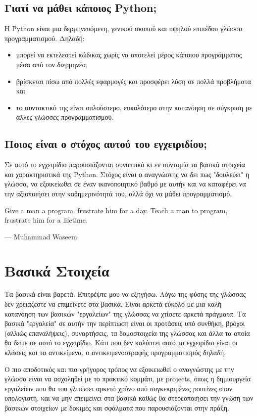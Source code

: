\documentclass[14pt]{extreport}
\begin{document}
\section{Γιατί να μάθει κάποιος Python;}

Η Python είναι μια δερμηνευόμενη, γενικού σκοπού και υψηλού επιπέδου γλώσσα
προγραμματισμού. Δηλαδή:
\begin{itemize}
    \itemsep0cm
    \item μπορεί να εκτελεστεί κώδικας χωρίς να αποτελεί μέρος κάποιου προγράμματος μέσα από τον διερμηνέα,
    \item βρίσκεται πίσω από πολλές εφαρμογές και προσφέρει λύση σε πολλά
          προβλήματα και
    \item το συντακτικό της είναι απλούστερο, ευκολότερο στην κατανόηση σε
          σύγκριση με άλλες γλώσσες προγραμματισμού.
\end{itemize}

\section{Ποιος είναι ο στόχος αυτού του εγχειριδίου;}

Σε αυτό το εγχειρίδιο παρουσιάζονται συνοπτικά κι εν συντομία τα βασικά στοιχεία και χαρακτηριστικά της Python. Στόχος είναι ο αναγνώστης να δει πως "δουλεύει" η γλώσσα, να εξοικείωθει σε έναν ικανοποιητικό βαθμό με αυτήν και να καταφέρει να την αξιοποιήσει στην καθημερινότητά του, αλλά όχι να μάθει προγραμματισμό.

\epigraph{Give a man a program, frustrate him for a day. Teach a man to program, frustrate him for a lifetime.}{--- Muhammad Waseem}


\chapter{Βασικά Στοιχεία}

Τα βασικά είναι βαρετά. Επιτρέψτε μου να εξηγήσω. Λόγω της φύσης της γλώσσας δεν χρειάζεστε να επιμείνετε στα βασικά. Είναι αρκετά εύκολο με μια καλή κατανόηση των βασικών "εργαλείων" της γλώσσας να χτίσετε αρκετά πράγματα. Τα βασικά "εργαλεία" σε αυτήν την περίπτωση είναι οι προτάσεις υπό συνθήκη, βρόχοι (αλλιώς επαναλήψεις), συναρτήσεις, τα δομοστοιχεία της γλώσσας και άλλα τα οποία θα δείτε σε αυτό το εγχειρίδιο. Κάτι που δεν καλύπτει αυτό το εγχειρίδιο είναι οι κλάσεις και τα αντικείμενα, ο αντικειμενοστραφής προγραμματισμός δηλαδή.

Ο πιο αποδοτικός και πιο γρήγορος τρόπος να εξοικειωθεί ο αναγνώστης με την γλώσσα είναι να ασχοληθεί με το πρακτικό κομμάτι, με projects, όπως η δημιουργεία εργαλείων που θα του γλιτώσει αρκετό χρόνο από συγκεκριμένες ρουτίνες στον υπολογιστή, και να μην επειμείνει στα βασικά καθώς θα στερεοποιήσει την γνώση των βασικών στοιχείων με δοκιμές και σφάλματα που παρουσιάζονται στην πράξη.
\end{document}
